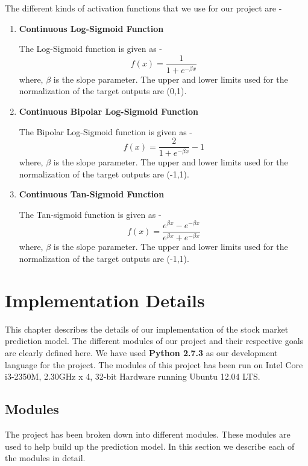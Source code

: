 \documentclass[a4paper,12bp]{report}
\begin{document}
The different kinds of activation functions that we use for our project are - 
\newpage
\begin{enumerate}
\item \textbf{Continuous Log-Sigmoid Function}

The Log-Sigmoid function is given as - 
\begin{equation}
f(x) = \frac{1}{ 1 + e^{-\beta x}}
\end{equation}
where, $\beta$ is the slope parameter. The upper and lower limits used for the normalization of the target outputs are (0,1). 

\item \textbf{Continuous Bipolar Log-Sigmoid Function}

The Bipolar Log-Sigmoid function is given as - 
\begin{equation}
f(x) = \frac{2}{1 + e^{-\beta x}} - 1
\end{equation}
where, $\beta$ is the slope parameter. The upper and lower limits used for the normalization of the target outputs are (-1,1). 

\item \textbf{Continuous Tan-Sigmoid Function}

The Tan-sigmoid function is given as - 
\begin{equation}
f(x) = \frac{e^{\beta x} - e^{-\beta x}}{e^{\beta x} + e^{-\beta x}}
\end{equation}
where, $\beta$ is the slope parameter. The upper and lower limits used for the normalization of the target outputs are (-1,1). 
\end{enumerate}

\chapter{Implementation Details}

This chapter describes the details of our implementation of the stock market prediction model. The different modules of our project and their respective goals are clearly defined here. We have used \textbf{Python 2.7.3} as our development language for the project. The modules of this project has been run on Intel Core i3-2350M, 2.30GHz x 4, 32-bit Hardware running Ubuntu 12.04 LTS.

\section{Modules}
The project has been broken down into different modules. These modules are used to help build up the prediction model. In this section we describe each of the modules in detail. 
\end{document}
